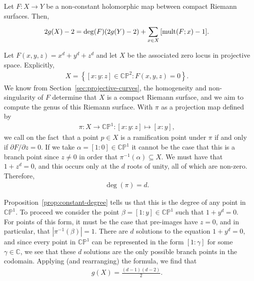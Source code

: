\begin{theorem}
	Let $ F:X \to Y $ be a non-constant holomorphic map between compact Riemann
	surfaces. Then,
	\begin{align*}
		2 g(X) - 2 = \deg(F) (2 g(Y) - 2) + \sum_{x \in X}^{}{[\operatorname{mult}(F;x)-1]}.
	\end{align*}
\end{theorem}

\begin{example}
	Let $ F(x,y,z)=x^d+y^d+z^d $ and let $ X $ be the associated zero locus in
	projective space. Explicitly,
	\begin{align*}
		X = \left\{ [x:y:z]\in \mathbb{C}\mathbb{P}^{2}: F(x,y,z)=0 \right\}.
	\end{align*}
	We know from Section~\ref{sec:projective-curves}, the homogeneity and
	non-singularity of $ F $ determine that $ X $ is a compact Riemann surface,
	and we aim to compute the genus of this Riemann surface. With $ \pi $ as a
	projection map defined by
	\begin{align*}
		\pi:X \to \mathbb{C}\mathbb{P}^{1}:[x:y:z] \mapsto [x:y],
	\end{align*}
	we call on the fact\sidenotemark\ that a point $ p \in X $ is a ramification
	point under $ \pi $ if and only if $ \partial F/\partial z=0 $. If we
	take $ \alpha = [1:0] \in \mathbb{C}\mathbb{P}^{1} $ it cannot be the case that
	this is a branch point since $ z \neq 0 $ in order that $ \pi ^{-1}( \alpha)
		\subseteq X $. We must have that $ 1+z^d=0 $, and this occurs only at the $ d
	$ roots of unity, all of which are non-zero. Therefore,
	\begin{align*}
		\deg(\pi) = d.
	\end{align*}

	Proposition~\ref{prop:constant-degree} tells us that this is the degree of any
	point in $ \mathbb{C}\mathbb{P}^{1} $. To proceed we consider the point $
		\beta = [1:y] \in \mathbb{C}\mathbb{P}^{1} $ such that $ 1+y^d=0 $. For points
	of this form, it must be the case that pre-images have $ z=0 $, and in
	particular, that $ |\pi ^{-1}(\beta)|=1 $. There are $ d $ solutions to the
	equation $ 1+y^d=0 $, and since every point in $ \mathbb{C}\mathbb{P}^{1} $ can be
	represented in the form $ [1:\gamma] $ for some $ \gamma \in \mathbb{C} $, we
	see that these $ d $ solutions are the only possible branch points in the
	codomain. Applying (and rearranging) the formula, we find that
	\begin{align*}
		g ( X ) = \frac{( d-1 )( d-2 )}{2}.
	\end{align*}
\end{example}
